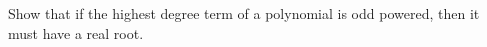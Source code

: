 \begin{exercise}
  \label{ex:hw05:odd-polynomial-root}
  Show that if the highest degree term of a polynomial is odd powered,
  then it must have a real root.
\end{exercise}
